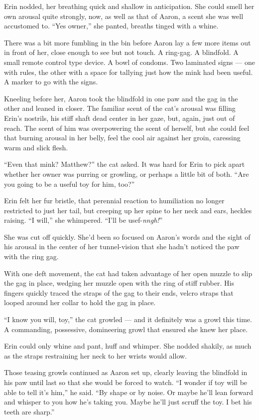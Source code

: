 Erin nodded, her breathing quick and shallow in anticipation. She could
smell her own arousal quite strongly, now, as well as that of Aaron, a
scent she was well accustomed to. ``Yes owner,'' she panted, breaths
tinged with a whine.

There was a bit more fumbling in the bin before Aaron lay a few more
items out in front of her, close enough to see but not touch. A
ring-gag. A blindfold. A small remote control type device. A bowl of
condoms. Two laminated signs --- one with rules, the other with a space
for tallying just how the mink had been useful. A marker to go with the
signs.

Kneeling before her, Aaron took the blindfold in one paw and the gag in
the other and leaned in closer. The familiar scent of the cat's arousal
was filling Erin's nostrils, his stiff shaft dead center in her gaze,
but, again, just out of reach. The scent of him was overpowering the
scent of herself, but she could feel that burning arousal in her belly,
feel the cool air against her groin, caressing warm and slick flesh.

``Even that mink? Matthew?'' the cat asked. It was hard for Erin to pick
apart whether her owner was purring or growling, or perhaps a little bit
of both. ``Are you going to be a useful toy for him, too?''

Erin felt her fur bristle, that perennial reaction to humiliation no
longer restricted to just her tail, but creeping up her spine to her
neck and ears, heckles raising. ``I will,'' she whimpered. ``I'll be
usef-\emph{nngh!}''

She was cut off quickly. She'd been so focused on Aaron's words and the
sight of his arousal in the center of her tunnel-vision that she hadn't
noticed the paw with the ring gag.

With one deft movement, the cat had taken advantage of her open muzzle
to slip the gag in place, wedging her muzzle open with the ring of stiff
rubber. His fingers quickly traced the straps of the gag to their ends,
velcro straps that looped around her collar to hold the gag in place.

``I know you will, toy,'' the cat growled --- and it definitely was a
growl this time. A commanding, possessive, domineering growl that
ensured she knew her place.

Erin could only whine and pant, huff and whimper. She nodded shakily, as
much as the straps restraining her neck to her wrists would allow.

Those teasing growls continued as Aaron set up, clearly leaving the
blindfold in his paw until last so that she would be forced to watch.
``I wonder if toy will be able to tell it's him,'' he said. ``By shape
or by noise. Or maybe he'll lean forward and whisper to you how he's
taking you. Maybe he'll just scruff the toy. I bet his teeth are
sharp.''

